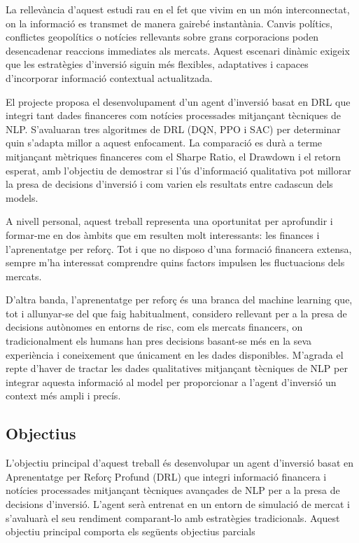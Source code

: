 \documentclass[12pt,a4paper,twoside]{book}
\begin{document}
La rellevància d’aquest estudi rau en el fet que vivim en un món interconnectat, on la informació es transmet de manera gairebé instantània. Canvis polítics, conflictes geopolítics o notícies rellevants sobre grans corporacions poden desencadenar reaccions immediates als mercats. Aquest escenari dinàmic exigeix que les estratègies d’inversió siguin més flexibles, adaptatives i capaces d’incorporar informació contextual actualitzada.

El projecte proposa el desenvolupament d’un agent d’inversió basat en DRL que integri tant dades financeres com notícies processades mitjançant tècniques de NLP. S’avaluaran tres algoritmes de DRL (DQN, PPO i SAC) per determinar quin s’adapta millor a aquest enfocament. La comparació es durà a terme mitjançant mètriques financeres com el Sharpe Ratio, el Drawdown i el retorn esperat, amb l’objectiu de demostrar si l’ús d’informació qualitativa pot millorar la presa de decisions d’inversió i com varien els resultats entre cadascun dels models.

A nivell personal, aquest treball representa una oportunitat per aprofundir i formar-me en dos àmbits que em resulten molt interessants: les finances i l’aprenentatge per reforç. Tot i que no disposo d’una formació financera extensa, sempre m’ha interessat comprendre quins factors impulsen les fluctuacions dels mercats.

D’altra banda, l’aprenentatge per reforç és una branca del machine learning que, tot i allunyar-se del que faig habitualment, considero rellevant per a la presa de decisions autònomes en entorns de risc, com els mercats financers, on tradicionalment els humans han pres decisions basant-se més en la seva experiència i coneixement que únicament en les dades disponibles. M’agrada el repte d'haver de tractar les dades qualitatives mitjançant tècniques de NLP per integrar aquesta informació al model per proporcionar a l’agent d’inversió un context més ampli i precís.

\subsection{Objectius}
L'objectiu principal d'aquest treball és desenvolupar un agent d’inversió basat en Aprenentatge per Reforç Profund (DRL) que integri informació financera i notícies processades mitjançant tècniques avançades de NLP per a la presa de decisions d'inversió. L’agent serà entrenat en un entorn de simulació de mercat i s’avaluarà el seu rendiment comparant-lo amb estratègies tradicionals. Aquest objectiu principal comporta els següents objectius parcials
\end{document}
